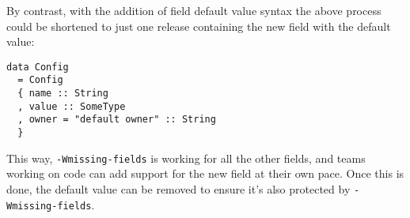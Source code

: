 \documentclass[en]{pracamgr}
\begin{document}
By contrast, with the addition of field default value syntax the above process could be shortened 
to just one \infra{} release containing the new field with the default value:\\
\begin{minipage}{\linewidth}
\begin{lstlisting}
data Config 
  = Config
  { name :: String
  , value :: SomeType
  , owner = "default owner" :: String
  }
\end{lstlisting}
\end{minipage}
This way, \texttt{-Wmissing-fields} is working for all the other fields, and teams working on \user{}
code can add support for the new field at their own pace.
Once this is done, the default value can be removed to ensure it's also protected by \texttt{-Wmissing-fields}.
\end{document}
